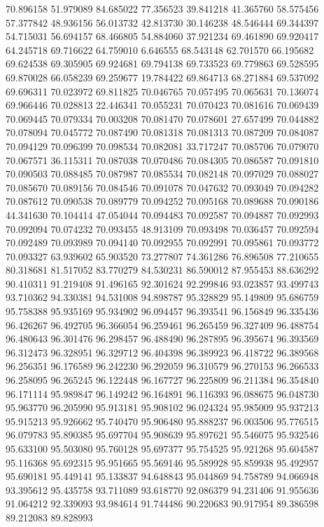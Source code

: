 70.896158
51.979089
84.685022
77.356523
39.841218
41.365760
58.575456
57.377842
48.936156
56.013732
42.813730
30.146238
48.546444
69.344397
54.715031
56.694157
68.466805
54.884060
37.921234
69.461890
69.920417
64.245718
69.716622
64.759010
6.646555
68.543148
62.701570
66.195682
69.624538
69.305905
69.924681
69.794138
69.733523
69.779863
69.528595
69.870028
66.058239
69.259677
19.784422
69.864713
68.271884
69.537092
69.696311
70.023972
69.811825
70.046765
70.057495
70.065631
70.136074
69.966446
70.028813
22.446341
70.055231
70.070423
70.081616
70.069439
70.069445
70.079334
70.003208
70.081470
70.078601
27.657499
70.044882
70.078094
70.045772
70.087490
70.081318
70.081313
70.087209
70.084087
70.094129
70.096399
70.098534
70.082081
33.717247
70.085706
70.079070
70.067571
36.115311
70.087038
70.070486
70.084305
70.086587
70.091810
70.090503
70.088485
70.087987
70.085534
70.082148
70.097029
70.088027
70.085670
70.089156
70.084546
70.091078
70.047632
70.093049
70.094282
70.087612
70.090538
70.089779
70.094252
70.095168
70.089688
70.090186
44.341630
70.104414
47.054044
70.094483
70.092587
70.094887
70.092993
70.092094
70.074232
70.093455
48.913109
70.093498
70.036457
70.092594
70.092489
70.093989
70.094140
70.092955
70.092991
70.095861
70.093772
70.093327
63.939602
65.903520
73.277807
74.361286
76.896508
77.210655
80.318681
81.517052
83.770279
84.530231
86.590012
87.955453
88.636292
90.410311
91.219408
91.496165
92.301624
92.299846
93.023857
93.499743
93.710362
94.330381
94.531008
94.898787
95.328829
95.149809
95.686759
95.758388
95.935169
95.934902
96.094457
96.393541
96.156849
96.335436
96.426267
96.492705
96.366054
96.259461
96.265459
96.327409
96.488754
96.480643
96.301476
96.298457
96.488490
96.287895
96.395674
96.393569
96.312473
96.328951
96.329712
96.404398
96.389923
96.418722
96.389568
96.256351
96.176589
96.242230
96.292059
96.310579
96.270153
96.266533
96.258095
96.265245
96.122448
96.167727
96.225809
96.211384
96.354840
96.171114
95.989847
96.149242
96.164891
96.116393
96.088675
96.048730
95.963770
96.205990
95.913181
95.908102
96.024324
95.985009
95.937213
95.915213
95.926662
95.740470
95.906480
95.888237
96.003506
95.776515
96.079783
95.890385
95.697704
95.908639
95.897621
95.546075
95.932546
95.633100
95.503080
95.760128
95.697377
95.754525
95.921268
95.604587
95.116368
95.692315
95.951665
95.569146
95.589928
95.859938
95.492957
95.690181
95.449141
95.133837
94.648843
95.044869
94.758789
94.066948
93.395612
95.435758
93.711089
93.618770
92.086379
94.231406
91.955636
91.064212
92.339093
93.984614
91.744486
90.220683
90.917954
89.386598
89.212083
89.828993
